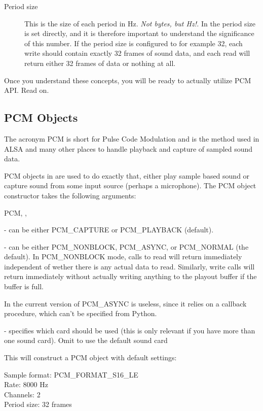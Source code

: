 \begin{description}
\item[Period size] This is the size of each period in Hz. \emph{Not bytes, but Hz!.} In 
the period size is set directly, and it is therefore important to understand the significance of this 
number. If the period size is configured to for example 32, each write should contain exactly 32 frames
of sound data, and each read will return either 32 frames of data or nothing at all.

\end{description}

Once you understand these concepts, you will be ready to actually utilize PCM API. Read on.

\subsection{PCM Objects}
\label{pcm-objects}

The acronym PCM is short for Pulse Code Modulation and is the method used in ALSA
and many other places to handle playback and capture of sampled sound data.

PCM objects in  are used to do exactly that, either play sample based
sound or capture sound from some input source (perhaps a microphone). The PCM object
constructor takes the following arguments:

\begin{classdesc}{PCM}{, , }

 - can be either PCM_CAPTURE or PCM_PLAYBACK (default).

 - can be either PCM_NONBLOCK, PCM_ASYNC, or PCM_NORMAL (the default).
In PCM_NONBLOCK mode, calls to read will return immediately independent of wether
there is any actual data to read. Similarly, write calls will return immediately
without actually writing anything to the playout buffer if the buffer is full.

In the current version of  PCM_ASYNC is useless, since it relies
on a callback procedure, which can't be specified from Python.

 - specifies which card should be used (this is only relevant 
if you have more than one sound card). Omit to use the default sound card

This will construct a PCM object with default settings:

Sample format: PCM_FORMAT_S16_LE \\
Rate: 8000 Hz \\
Channels: 2 \\
Period size: 32 frames \\
\end{classdesc}

